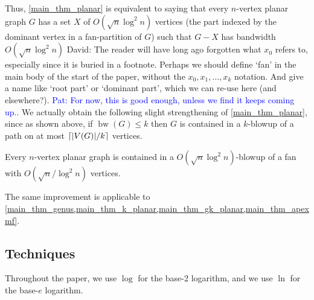 \documentclass{patmorin}
\renewcommand{\leq}{\leqslant}
\newcommand{\david}[1]{{\color{orange} David: #1}}
\newcommand{\pat}[1]{\textcolor{Blue}{Pat: #1}}
\DeclareMathOperator{\bw}{bw}
\begin{document}
Thus, \cref{main_thm_planar} is equivalent to saying that every $n$-vertex planar graph $G$ has a set $X$ of  $O(\sqrt{n}\log^2 n)$ vertices (the part indexed by the dominant vertex in a fan-partition of $G$) such that $G-X$ has bandwidth $O(\sqrt{n}\log^2 n)$ \david{The reader will have long ago forgotten what $x_0$ refers to, especially since it is buried in a footnote. Perhaps we should define `fan' in the main body of the start of the paper, without the $x_0,x_1,\dots,x_k$ notation. And give a name like `root part'  or `dominant part', which we can re-use here (and elsewhere?).} \pat{For now, this is good enough, unless we find it keeps coming up.}. We actually obtain the following slight strengthening of \cref{main_thm_planar}, since as shown above, if $\bw(G)\leq k$ then $G$ is contained in a $k$-blowup of a path on at most ${\lceil |V(G)|/k \rceil}$ vertices.

\begin{thm}\label{main_thm_planar_order}
  Every $n$-vertex planar graph is contained in a $O(\sqrt{n}\log^2 n)$-blowup of a fan with
  $O(\sqrt{n}/\log^2 n)$ vertices.
\end{thm}

The same improvement is applicable to \cref{main_thm_genus,main_thm_k_planar,main_thm_gk_planar,main_thm_apexmf}.



\subsection{Techniques}


Throughout the paper, we use $\log$ for the base-2 logarithm, and we use $\ln$ for the base-$e$ logarithm.
\end{document}
